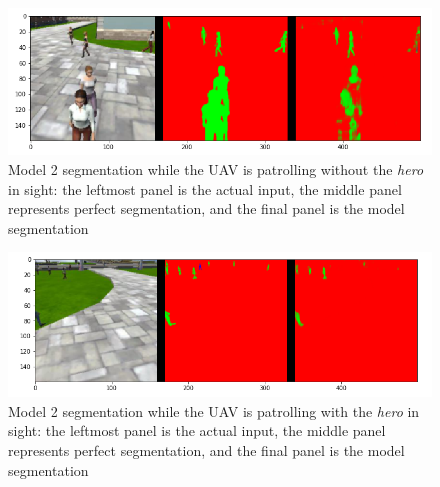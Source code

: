 \documentclass[a4paper]{article}
\begin{document}
\begin{figure}[h]
\centering
\includegraphics[scale=0.4]{model_2_2}
\caption{Model 2 segmentation while the UAV is patrolling without the \textit{hero} in sight: the leftmost panel is the actual input, the middle panel represents perfect segmentation, and the final panel is the model segmentation}
\end{figure}

\begin{figure}[h]
\centering
\includegraphics[scale=0.4]{model_2_3}
\caption{Model 2 segmentation while the UAV is patrolling with the \textit{hero} in sight: the leftmost panel is the actual input, the middle panel represents perfect segmentation, and the final panel is the model segmentation}
\end{figure}
\end{document}
